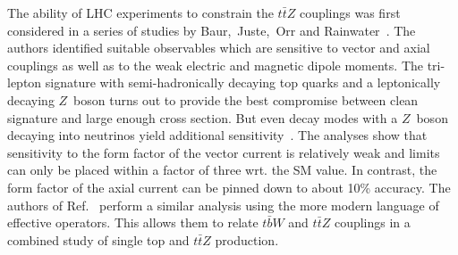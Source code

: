 \documentclass[preprint]{JHEP3}
\def\ttbZ{t\bar{t}Z}
\begin{document}
The ability of LHC experiments to constrain the $\ttbZ$ couplings was first considered in a series of studies by Baur,~Juste,~Orr and Rainwater~\cite{Baur:2004uw,Baur:2005wi}. 
The authors identified suitable observables which are sensitive to vector and axial couplings as well as to the weak electric and magnetic dipole moments.
The tri-lepton signature with semi-hadronically decaying top quarks and a leptonically decaying $Z$~boson turns out to provide the best compromise between
clean signature and large enough cross section. 
But even decay modes with a $Z$~boson decaying into neutrinos yield additional sensitivity~\cite{Baur:2005wi}.
The analyses show that sensitivity to the form factor of the vector current is relatively weak and limits can only be placed within a factor of three wrt. the SM value. 
In contrast, the form factor of the axial current can be pinned down to about 10\% accuracy. 
The authors of Ref.~\cite{Berger:2009hi} perform a similar analysis using the more modern language of effective operators.
This allows them to relate $t\bar{b}W$ and $\ttbZ$ couplings in a combined study of single top and $\ttbZ$ production.
\end{document}
